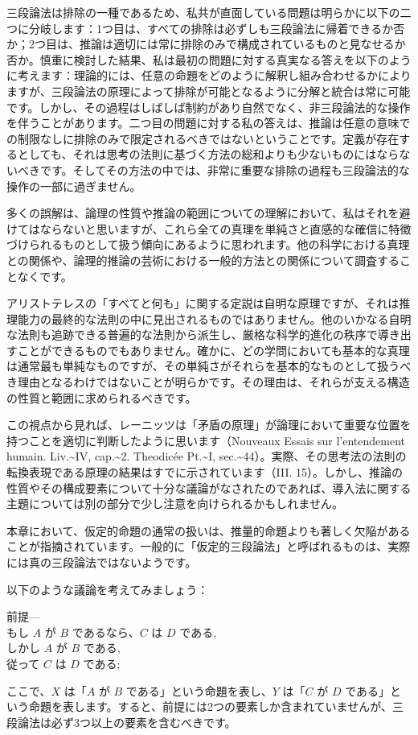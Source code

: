 \documentclass[a4paper,11pt,openany]{ltjsbook}
\begin{document}
三段論法は排除の一種であるため、私共が直面している問題は明らかに以下の二つに分岐します：1つ目は、すべての排除は必ずしも三段論法に帰着できるか否か；2つ目は、推論は適切には常に排除のみで構成されているものと見なせるか否か。慎重に検討した結果、私は最初の問題に対する真実なる答えを以下のように考えます：理論的には、任意の命題をどのように解釈し組み合わせるかによりますが、三段論法の原理によって排除が可能となるように分解と統合は常に可能です。しかし、その過程はしばしば制約があり自然でなく、非三段論法的な操作を伴うことがあります。二つ目の問題に対する私の答えは、推論は任意の意味での制限なしに排除のみで限定されるべきではないということです。定義が存在するとしても、それは思考の法則に基づく方法の総和よりも少ないものにはならないべきです。そしてその方法の中では、非常に重要な排除の過程も三段論法的な操作の一部に過ぎません。

多くの誤解は、論理の性質や推論の範囲についての理解において、私はそれを避けてはならないと思いますが、これら全ての真理を単純さと直感的な確信に特徴づけられるものとして扱う傾向にあるように思われます。他の科学における真理との関係や、論理的推論の芸術における一般的方法との関係について調査することなくです。

アリストテレスの「すべてと何も」に関する定説は自明な原理ですが、それは推理能力の最終的な法則の中に見出されるものではありません。他のいかなる自明な法則も追跡できる普遍的な法則から派生し、厳格な科学的進化の秩序で導き出すことができるものでもありません。確かに、どの学問においても基本的な真理は通常最も単純なものですが、その単純さがそれらを基本的なものとして扱うべき理由となるわけではないことが明らかです。その理由は、それらが支える構造の性質と範囲に求められるべきです。

この視点から見れば、レーニッツは「矛盾の原理」が論理において重要な位置を持つことを適切に判断したように思います（Nouveaux Essais sur l'entendement humain. Liv.\textasciitilde{}IV, cap.\textasciitilde{}2. Theodicée Pt.\textasciitilde{}I, sec.\textasciitilde{}44）。実際、その思考法の法則の転換表現である原理の結果はすでに示されています（III. 15）。しかし、推論の性質やその構成要素について十分な議論がなされたのであれば、導入法に関する主題については別の部分で少し注意を向けられるかもしれません。

本章において、仮定的命題の通常の扱いは、推量的命題よりも著しく欠陥があることが指摘されています。一般的に「仮定的三段論法」と呼ばれるものは、実際には真の三段論法ではないようです。

以下のような議論を考えてみましょう：

\begin{tabbing}
前提--- \= \\
         \>もし $A$ が $B$ であるなら、$C$ は $D$ である,   \\
         \>しかし $A$ が $B$ である,   \\
         \>従って $C$ は $D$ である;
\end{tabbing}
ここで、$X$ は「$A$ が $B$ である」という命題を表し、$Y$ は「$C$ が $D$ である」という命題を表します。すると、前提には2つの要素しか含まれていませんが、三段論法は必ず3つ以上の要素を含むべきです。
\end{document}
